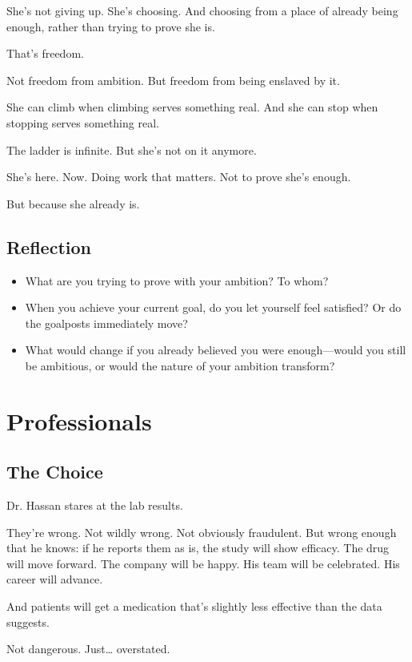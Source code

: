 \documentclass[11pt,twoside]{book}
\begin{document}
She's not giving up. She's choosing. And choosing from a place of already being enough, rather than trying to prove she is.

That's freedom.

Not freedom from ambition. But freedom from being enslaved by it.

She can climb when climbing serves something real. And she can stop when stopping serves something real.

The ladder is infinite. But she's not on it anymore.

She's here. Now. Doing work that matters. Not to prove she's enough.

But because she already is.

\section*{Reflection}

\begin{itemize}
\item What are you trying to prove with your ambition? To whom?
\item When you achieve your current goal, do you let yourself feel satisfied? Or do the goalposts immediately move?
\item What would change if you already believed you were enough—would you still be ambitious, or would the nature of your ambition transform?
\end{itemize}

\chapter{Professionals}

\section*{The Choice}

Dr. Hassan stares at the lab results.

They're wrong. Not wildly wrong. Not obviously fraudulent. But wrong enough that he knows: if he reports them as is, the study will show efficacy. The drug will move forward. The company will be happy. His team will be celebrated. His career will advance.

And patients will get a medication that's slightly less effective than the data suggests.

Not dangerous. Just\ldots{} overstated.
\end{document}
